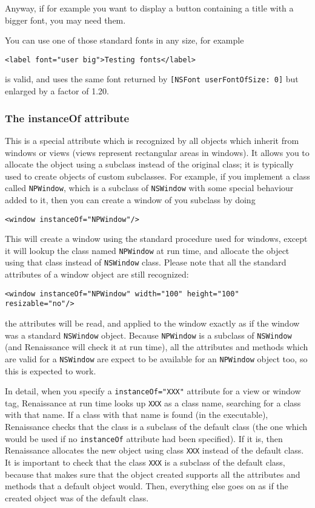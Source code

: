 Anyway, if for example you want to display a button containing a title
with a bigger font, you may need them.

You can use one of those standard fonts in any size, for example
\begin{verbatim}
<label font="user big">Testing fonts</label>
\end{verbatim}
is valid, and uses the same font returned by \texttt{[NSFont
userFontOfSize: 0]} but enlarged by a factor of 1.20.

\subsubsection{The instanceOf attribute}
This is a special attribute which is recognized by all objects which
inherit from windows or views (views represent rectangular areas in
windows).  It allows you to allocate the object using a subclass
instead of the original class; it is typically used to create objects
of custom subclasses.  For example, if you implement a class called
\texttt{NPWindow}, which is a subclass of \texttt{NSWindow} with some
special behaviour added to it, then you can create a window of you
subclass by doing
\begin{verbatim}
<window instanceOf="NPWindow"/>
\end{verbatim}
This will create a window using the standard procedure used for
windows, except it will lookup the class named \texttt{NPWindow} at
run time, and allocate the object using that class instead of
\texttt{NSWindow} class.  Please note that all the standard attributes
of a window object are still recognized:
\begin{verbatim}
<window instanceOf="NPWindow" width="100" height="100" resizable="no"/>
\end{verbatim}
the attributes will be read, and applied to the window exactly as if
the window was a standard \texttt{NSWindow} object.  Because
\texttt{NPWindow} is a subclass of \texttt{NSWindow} (and Renaissance
will check it at run time), all the attributes and methods which are
valid for a \texttt{NSWindow} are expect to be available for an
\texttt{NPWindow} object too, so this is expected to work.

In detail, when you specify a \texttt{instanceOf="XXX"} attribute for a
view or window tag, Renaissance at run time looks up \texttt{XXX} as a
class name, searching for a class with that name.  If a class with
that name is found (in the executable), Renaissance checks that the
class is a subclass of the default class (the one which would be used
if no \texttt{instanceOf} attribute had been specified).  If it is, then
Renaissance allocates the new object using class \texttt{XXX} instead
of the default class.  It is important to check that the class
\texttt{XXX} is a subclass of the default class, because that makes sure
that the object created supports all the attributes and methods that a
default object would.  Then, everything else goes on as if the created
object was of the default class.

